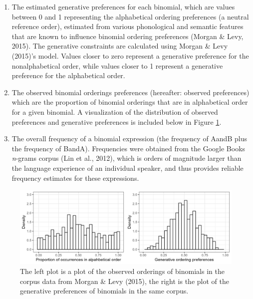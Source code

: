 \documentclass[10pt, letterpaper, hidelinks]{article}
\newenvironment{CodeChunk}{}{}
\begin{document}
\begin{enumerate}
\def\labelenumi{\arabic{enumi}.}
\item
  The estimated generative preferences for each binomial, which are
  values between 0 and 1 representing the alphabetical ordering
  preferences (a neutral reference order), estimated from various
  phonological and semantic features that are known to influence
  binomial ordering preferences (Morgan \& Levy, 2015). The generative
  constraints are calculated using Morgan \& Levy (2015)'s model. Values
  closer to zero represent a generative preference for the
  nonalphabetical order, while values closer to 1 represent a generative
  preference for the alphabetical order.
\item
  The observed binomial orderings preferences (hereafter: observed
  preferences) which are the proportion of binomial orderings that are
  in alphabetical order for a given binomial. A visualization of the
  distribution of observed preferences and generative preferences is
  included below in Figure \ref{fig:corpusplot1}.
\item
  The overall frequency of a binomial expression (the frequency of AandB
  plus the frequency of BandA). Frequencies were obtained from the
  Google Books \emph{n}-grams corpus (Lin et al., 2012), which is orders
  of magnitude larger than the language experience of an individual
  speaker, and thus provides reliable frequency estimates for these
  expressions.
\end{enumerate}

\begin{CodeChunk}
\begin{figure}[tb]

{\centering \includegraphics[width=1\linewidth]{Figures/corpus_plots} 

}

\caption[The left plot is a plot of the observed orderings of binomials in the corpus data from Morgan \& Levy (2015), the right is the plot of the generative preferences of binomials in the same corpus]{The left plot is a plot of the observed orderings of binomials in the corpus data from Morgan \& Levy (2015), the right is the plot of the generative preferences of binomials in the same corpus.}\label{fig:corpusplot1}
\end{figure}
\end{CodeChunk}
\end{document}
